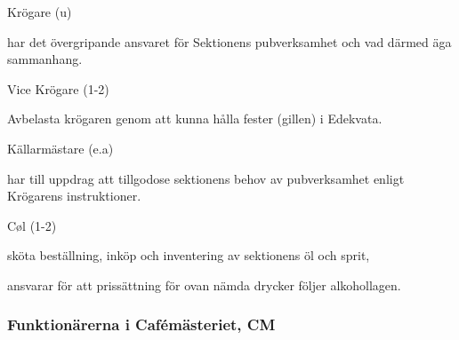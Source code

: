 \documentclass[10pt]{article}
\begin{document}
\begin{emptylist}
    \item Krögare (u)
        \begin{dashlist}
            \item har det övergripande ansvaret för Sektionens pubverksamhet
                och vad därmed äga sammanhang.
        \end{dashlist}
    \item Vice Krögare (1-2)
        \begin{dashlist}
        \item Avbelasta krögaren genom att kunna hålla fester (gillen) i
            Edekvata.
        \end{dashlist}
    \item Källarmästare (e.a)
        \begin{dashlist}
            \item har till uppdrag att tillgodose sektionens behov av
                pubverksamhet enligt Krögarens instruktioner.
        \end{dashlist}
    \item Cøl (1-2)
        \begin{dashlist}
            \item sköta beställning, inköp och inventering av sektionens öl
                och sprit,
            \item ansvarar för att prissättning för ovan nämda drycker
                följer alkohollagen.
        \end{dashlist}
\end{emptylist}
\subsubsection{Funktionärerna i Cafémästeriet, CM}
\end{document}
